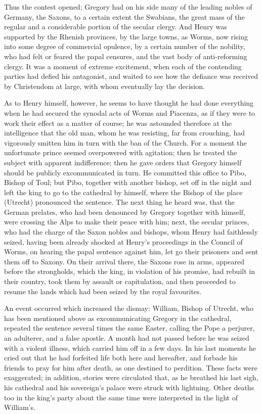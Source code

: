 Thus the contest opened; Gregory had on his side
many of the leading nobles of Germany, the Saxons, to a certain extent
the Swabians, the great mass of the regular and a considerable portion
of the secular clergy. And Henry was supported by the Rhenish
provinces, by the large towns, as Worms, now rising into some degree
of commercial opulence, by a certain number of the nobility, who had
felt or feared the papal censures, and the vast body of anti-reforming
clergy. It was a moment of extreme excitement, when each of the
contending parties had defied his antagonist, and waited to see how
the defiance was received by Christendom at large, with whom
eventually lay the decision.

As to Henry himself, however, he seems to have
thought he had done everything when he had secured the synodal acts of
Worms and Piacenza, as if they were to work their effect as a matter
of course; he was astounded therefore at the intelligence that the old
man, whom he was resisting, far from crouching, had vigorously smitten
him in turn with the ban of the Church. For a moment the unfortunate
prince seemed overpowered with agitation; then he treated the subject
with apparent indifference; then he gave orders that Gregory himself
should be publicly excommunicated in turn. He committed this office to
Pibo, Bishop of Toul; but Pibo, together with another bishop, set off
in the night and left the king to go to the cathedral by himself,
where the Bishop of the place (Utrecht) pronounced the sentence. The
next thing he heard was, that the German prelates, who had been
denounced by Gregory together with himself, were crossing the Alps to
make their peace with him; next, the secular princes, who had the
charge of the Saxon nobles and bishops, whom Henry had faithlessly
seized, having been already shocked at Henry's proceedings in the
Council of Worms, on hearing the papal sentence against him, let go
their prisoners and sent them off to Saxony. On their arrival there,
the Saxons rose in arms, appeared before the strongholds, which the
king, in violation of his promise, had rebuilt in their country, took
them by assault or capitulation, and then proceeded to resume the
lands which had been seized by the royal favourites.

An event occurred which increased the dismay:
William, Bishop of Utrecht, who has been mentioned above as
excommunicating Gregory in the cathedral, repeated the sentence
several times the same Easter, calling the Pope a perjurer, an
adulterer, and a false apostle. A month had not passed before he was
seized with a violent illness, which carried him off in a few days. In
his last moments he cried out that he had forfeited life both here and
hereafter, and forbade his friends to pray for him after death, as one
destined to perdition. These facts were exaggerated; in addition,
stories were circulated that, as he breathed his last sigh, his
cathedral and his sovereign's palace were struck with lightning. Other
deaths too in the king's party about the same time were interpreted in
the light of William's.

